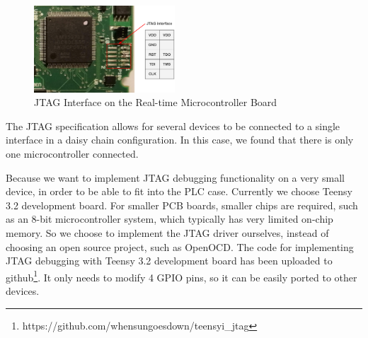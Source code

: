 \begin{figure}[th]
	\includegraphics[width=0.47\textwidth]{figures/board_jtag}
	\centering
	\caption{JTAG Interface on the Real-time Microcontroller Board}
	\label{fig:board_jtag}
\end{figure}

The JTAG specification allows for several devices to be connected to a single interface in a daisy chain configuration. In this case, we found that there is only one microcontroller connected.

Because we want to implement JTAG debugging functionality on a very small device, in order to be able to fit into the PLC case. Currently we choose Teensy 3.2 development board. For smaller PCB boards, smaller chips are required, such as an 8-bit microcontroller system, which typically has very limited on-chip memory. So we choose to implement the JTAG driver ourselves, instead of choosing an open source project, such as OpenOCD\cite{hogl2006open}. The code for implementing JTAG debugging with Teensy 3.2 development board has been uploaded to github\footnote{https://github.com/whensungoesdown/teensyi\_jtag}. It only needs to modify 4 GPIO pins, so it can be easily ported to other devices.
